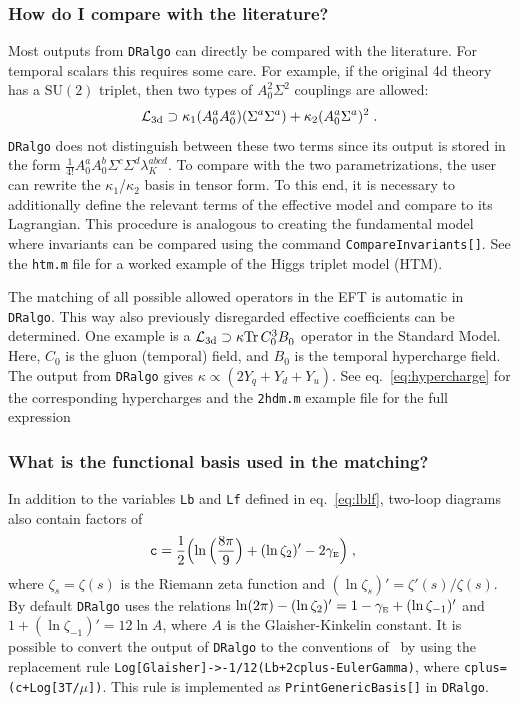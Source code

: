 \documentclass[11pt]{article}
\def\dralgo{{\tt DRalgo}}
\newcommand{\gammaE}{{\gamma_\rmii{E}}}
\renewcommand{\tr}{{\rm Tr\,}}
\newcommand{\Yq}{Y_{q}}
\newcommand{\Yu}{Y_{u}}
\newcommand{\Yd}{Y_{d}}
\renewcommand{\rmi}[1]{{\mbox{\scriptsize #1}}}
\newcommand{\rmii}[1]{{\mbox{\tiny\rm{#1}}}}
\begin{document}
%
\subsubsection{How do I compare with the literature?}
Most outputs from \dralgo{} can directly be compared with the literature.
For temporal scalars this requires some care. 
For example,
if the original 4d theory has a $\mathrm{SU}(2)$ triplet,
then two types of $A_0^2 \Sigma^2$ couplings are allowed:
\begin{align}
  \mathcal{L}_{\rmi{3d}} \supset
  \kappa_1 (A_0^a A_0^a)(\Sigma^a\Sigma^a) +
  \kappa_2 (A_0^a \Sigma^a)^2
  \;.
\end{align}
\dralgo{} does not distinguish between these two terms
since its output is stored in the form
$\frac{1}{4!}A_0^a A_0^b \Sigma^c \Sigma^d \lambda_K^{abcd}$.
To compare with the two parametrizations,
the user can rewrite the
$\kappa_1$/$\kappa_2$ basis in tensor form.
To this end,
it is necessary to additionally define the relevant terms of
the effective model and compare to its Lagrangian.
This procedure is analogous to creating the fundamental model where
invariants can be compared using the command
{\tt CompareInvariants[]}.
See the {\tt htm.m} file for a worked example of
the Higgs triplet model (HTM).

The matching of all possible allowed operators in the EFT is automatic
in \dralgo{}.
This way also previously disregarded effective coefficients can be determined.
One example is a
$\mathcal{L}_{\rmi{3d}} \supset \kappa \tr C_{0}^3B_{0}^{ }$
operator in the Standard Model.
Here,
$C_0$ is the gluon (temporal) field, and
$B_0$ is the temporal hypercharge field.
The output from \dralgo{} gives
$\kappa \propto (2\Yq + \Yd + \Yu)$.
See
eq.~\eqref{eq:hypercharge} for the corresponding hypercharges and
the {\tt 2hdm.m} example file for the full expression

%
\subsubsection{What is the functional basis used in the matching?}
\label{sec:basis}

In addition to the variables
{\tt Lb} and
{\tt Lf} defined in eq.~\eqref{eq:lblf}, two-loop diagrams also contain factors of
\begin{align}
\label{eq:c}
{\tt c} &=
\frac{1}{2} \Bigl(
  \ln \Big( \frac{8\pi}{9} \Big)
  + (\ln\zeta_{2})'
 - 2 \gammaE \Bigr)
  \;,
\end{align}
where
$\zeta_{s}=\zeta(s)$ is the Riemann zeta function and
$(\ln \zeta_s)'=\zeta'(s)/\zeta(s)$.
By default \dralgo{}  uses the relations
$\ln(2\pi) - (\ln\zeta_{2})' = 1 - \gammaE + (\ln\zeta_{-1})'$
and
$1+(\ln\zeta_{-1})' = 12\ln A$,
where $A$ is the Glaisher-Kinkelin constant.
It is possible to convert the output of \dralgo{} to
the conventions of~\cite{Kajantie:1995dw}
by using the replacement rule
{\tt Log[Glaisher]->-1/12(Lb+2cplus-EulerGamma)},
where
{\tt cplus=(c+Log[3T/$\mu$])}.
This rule is implemented as
{\tt PrintGenericBasis[]} in \dralgo{}.
\end{document}
